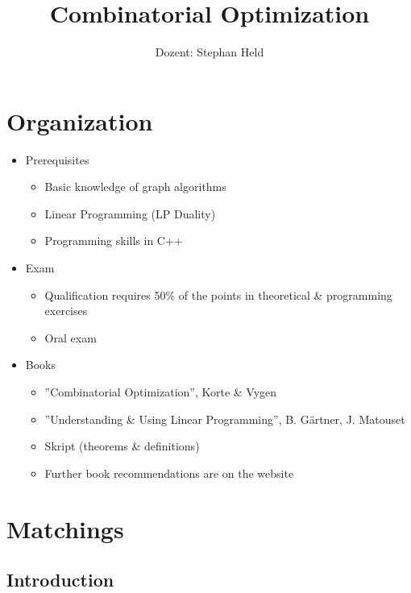 \documentclass[11pt, a4paper]{article}
\title{Combinatorial Optimization}
\author{Dozent: Stephan Held}
\theoremstyle{remark}
\theoremstyle{definition}
\begin{document}
\maketitle
\tableofcontents
\clearpage

\section{Organization}
\begin{itemize}
	\item Prerequisites
	\begin{itemize}
		\item Basic knowledge of graph algorithms
		\item Linear Programming (LP Duality)
		\item Programming skills in C++
	\end{itemize}

	\item Exam
	\begin{itemize}
		\item Qualification requires 50\% of the points in theoretical \&
		programming exercises
		\item Oral exam
	\end{itemize}

	\item Books
	\begin{itemize}
		\item ''Combinatorial Optimization'', Korte \& Vygen
		\item ''Understanding \& Using Linear Programming'', B. Gärtner,
		J. Matouset
		\item Skript (theorems \& definitions)
		\item Further book recommendations are on the website
	\end{itemize}
\end{itemize}

\section{Matchings}
\subsection{Introduction}
\end{document}
